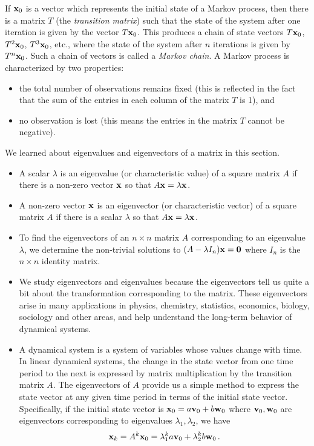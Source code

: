 \begin{example}
If $\mathbf{x}_0$ is a vector which represents the initial state of a Markov process, then there is a matrix $T$ (the \emph{transition matrix}) such that the state of the system after one iteration is given by the vector $T\mathbf{x}_0$. This produces a chain of state vectors $T\mathbf{x}_0$, $T^2 \mathbf{x}_0$, $T^3 \mathbf{x}_0$, etc., where the state of the system after $n$ iterations is given by $T^n \mathbf{x}_0$.  Such a chain of vectors is called a \emph{Markov chain}. A Markov process is characterized by two properties:
\begin{itemize}
\item the total number of observations remains fixed (this is reflected in the fact that the sum of the entries in each column of the matrix $T$ is 1), and
\item no observation is lost (this means the entries in the matrix $T$ cannot be negative).
\end{itemize}


\end{example}

We learned about eigenvalues and eigenvectors of a matrix in this section.
\begin{itemize}
\item A scalar $\lambda$ is an  eigenvalue (or characteristic value) of a square matrix $A$ if there is a non-zero vector $\mathbf{x}$ so that $A\mathbf{x} = \lambda \mathbf{x}$.
\item A non-zero vector $\mathbf{x}$ is an eigenvector (or characteristic vector) of a square matrix $A$ if there is a scalar $\lambda$ so that $A\mathbf{x} = \lambda \mathbf{x}$.
\item To find the eigenvectors of an $n \times n$ matrix $A$ corresponding to an eigenvalue $\lambda$, we determine the non-trivial solutions to $(A - \lambda I_n)\mathbf{x}=\mathbf{0}$ where $I_n$ is the $n\times n$ identity matrix.
\item We study eigenvectors and eigenvalues because the eigenvectors tell us quite a bit about the transformation corresponding to the matrix. These eigenvectors arise in many applications in physics, chemistry, statistics, economics, biology, sociology and other areas, and help understand the long-term behavior of dynamical systems.
\item A dynamical system is a system of variables whose values change with time. In linear dynamical systems, the change in the state vector from one time period to the next is expressed by matrix multiplication by the transition matrix $A$. The eigenvectors of $A$ provide us a simple method to express the state vector at any given time period in terms of the initial state vector. Specifically, if the initial state vector is $\mathbf{x}_0=a\mathbf{v}_0+b\mathbf{w}_0$ where $\mathbf{v}_0, \mathbf{w}_0$ are eigenvectors corresponding to eigenvalues $\lambda_1, \lambda_2$, we have 
\[ \mathbf{x}_k = A^k \mathbf{x}_0 = \lambda_1^k a \mathbf{v}_0 + \lambda_2^k b \mathbf{w}_0\,.\]
\end{itemize}





